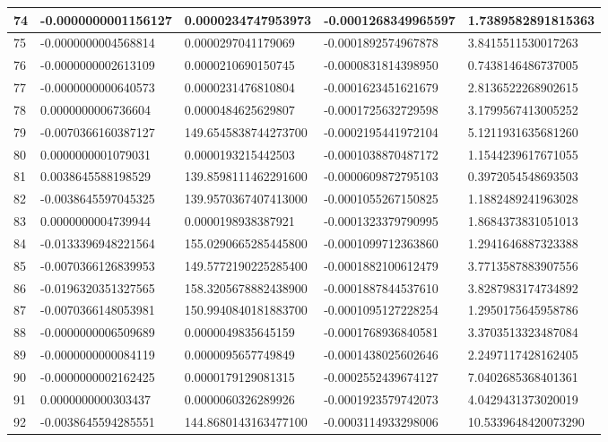 \begin{center}
\begin{longtable}{|p{0.5cm}|p{3.5cm}|p{3.5cm}|p{3.5cm}|p{3.5cm}|}
\hline
74  & -0.0000000001156127  & 0.0000234747953973  & -0.0001268349965597  & 1.7389582891815363\\
\hline
75  & -0.0000000004568814  & 0.0000297041179069  & -0.0001892574967878  & 3.8415511530017263\\
\hline
76  & -0.0000000002613109  & 0.0000210690150745  & -0.0000831814398950  & 0.7438146486737005\\
\hline
77  & -0.0000000000640573  & 0.0000231476810804  & -0.0001623451621679  & 2.8136522268902615\\
\hline
78  & 0.0000000006736604  & 0.0000484625629807  & -0.0001725632729598  & 3.1799567413005252\\
\hline
79  & -0.0070366160387127  & 149.6545838744273700  & -0.0002195441972104  & 5.1211931635681260\\
\hline
80  & 0.0000000001079031  & 0.0000193215442503  & -0.0001038870487172  & 1.1544239617671055\\
\hline
81  & 0.0038645588198529  & 139.8598111462291600  & -0.0000609872795103  & 0.3972054548693503\\
\hline
82  & -0.0038645597045325  & 139.9570367407413000  & -0.0001055267150825  & 1.1882489241963028\\
\hline
83  & 0.0000000004739944  & 0.0000198938387921  & -0.0001323379790995  & 1.8684373831051013\\
\hline
84  & -0.0133396948221564  & 155.0290665285445800  & -0.0001099712363860  & 1.2941646887323388\\
\hline
85  & -0.0070366126839953  & 149.5772190225285400  & -0.0001882100612479  & 3.7713587883907556\\
\hline
86  & -0.0196320351327565  & 158.3205678882438900  & -0.0001887844537610  & 3.8287983174734892\\
\hline
87  & -0.0070366148053981  & 150.9940840181883700  & -0.0001095127228254  & 1.2950175645958786\\
\hline
88  & -0.0000000006509689  & 0.0000049835645159  & -0.0001768936840581  & 3.3703513323487084\\
\hline
89  & -0.0000000000084119  & 0.0000095657749849  & -0.0001438025602646  & 2.2497117428162405\\
\hline
90  & -0.0000000002162425  & 0.0000179129081315  & -0.0002552439674127  & 7.0402685368401361\\
\hline
91  & 0.0000000000303437  & 0.0000060326289926  & -0.0001923579742073  & 4.0429431373020019\\
\hline
92  & -0.0038645594285551  & 144.8680143163477100  & -0.0003114933298006  & 10.5339648420073290\\

\end{longtable}
\end{center}
